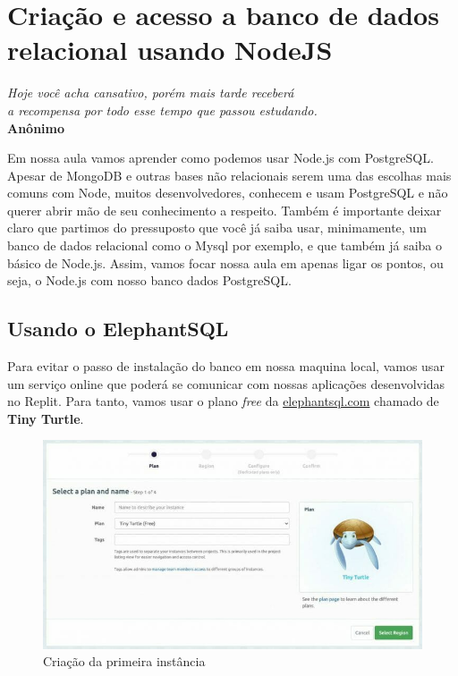 \chapter{Criação e acesso a banco de dados relacional usando NodeJS}

\begin{flushright}
	\textit{
		Hoje você acha cansativo, porém mais tarde receberá \\ a recompensa por todo esse tempo que passou estudando.
	} \\
	
	\textbf{Anônimo}
\end{flushright}

Em nossa aula vamos aprender como podemos usar Node.js com PostgreSQL. Apesar de MongoDB e outras bases não relacionais serem uma das escolhas mais comuns com Node, muitos desenvolvedores, conhecem e usam PostgreSQL e não querer abrir mão de seu conhecimento a respeito. Também é importante deixar claro que partimos do pressuposto que você já saiba usar, minimamente, um banco de dados relacional como o Mysql por exemplo, e que também já saiba o básico de Node.js. Assim, vamos focar nossa aula em apenas ligar os pontos, ou seja, o Node.js com nosso banco dados PostgreSQL.

\section{Usando o ElephantSQL}

Para evitar o passo de instalação do banco em nossa maquina local, vamos usar um serviço online que poderá se comunicar com nossas aplicações desenvolvidas no Replit. Para tanto, vamos usar o plano \textit{free} da \url{elephantsql.com} chamado de \textbf{Tiny Turtle}.

\begin{figure}[H]
	\centering
	\includegraphics[scale=0.5]{imagens/nodejs-postgresql.jpg}
	\caption{
		Criação da primeira instância
	}
	\label{fig:instancia_01}
\end{figure}

